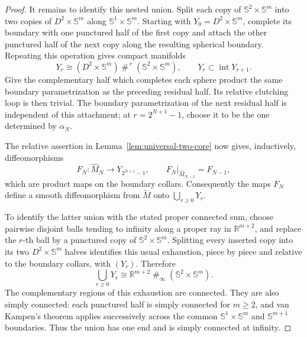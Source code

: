 \documentclass[11pt,reqno]{amsart}
\theoremstyle{definition}
\numberwithin{equation}{section}
\begin{document}
\begin{proof}
It remains to identify this nested union.  Split each copy of
\(\mathbb S^2\times\mathbb S^m\) into two copies of
\(D^2\times\mathbb S^m\) along
\(\mathbb S^1\times\mathbb S^m\).  Starting with
\(Y_0=D^2\times\mathbb S^m\), complete its boundary with one punctured
half of the first copy and attach the other punctured half of the next
copy along the resulting spherical boundary.  Repeating this operation
gives compact manifolds
\[
 Y_r\cong
 (D^2\times\mathbb S^m)
 \mathbin{\#}^{\,r}(\mathbb S^2\times\mathbb S^m),
 \qquad
 Y_r\subset\operatorname{int}Y_{r+1}.
\]
Give the complementary half which completes each sphere product the
same boundary parametrization as the preceding residual half.  Its
relative clutching loop is then trivial.  The boundary parametrization
of the next residual half is independent of this attachment; at
\(r=2^{N+1}-1\), choose it to be the one determined by \(\alpha_N\).

The relative assertion in Lemma~\ref{lem:universal-two-core} now gives,
inductively, diffeomorphisms
\[
 F_N:\widehat M_N\longrightarrow Y_{2^{N+1}-1},
 \qquad
 F_N|_{\widehat M_{N-1}}=F_{N-1},
\]
which are product maps on the boundary collars.  Consequently the maps
\(F_N\) define a smooth diffeomorphism from \(\widetilde M\) onto
\(\bigcup_{r\ge0}Y_r\).

To identify the latter union with the stated proper connected sum,
choose pairwise disjoint balls tending to infinity along a proper ray
in \(\mathbb R^{m+2}\), and replace the \(r\)-th ball by a punctured
copy of \(\mathbb S^2\times\mathbb S^m\).  Splitting every inserted
copy into its two \(D^2\times\mathbb S^m\) halves identifies this
usual exhaustion, piece by piece and relative to the boundary collars,
with \((Y_r)\).  Therefore
\[
 \bigcup_{r\ge0}Y_r
 \cong
 \mathbb R^{m+2}\mathbin{\#}_{\infty}
 (\mathbb S^2\times\mathbb S^m).
\]
The complementary regions of this exhaustion are connected.  They are
also simply connected: each punctured half is simply connected for
\(m\ge2\), and van Kampen's theorem applies successively across the
common \(\mathbb S^1\times\mathbb S^m\) and
\(\mathbb S^{m+1}\) boundaries.  Thus the union has one end and is
simply connected at infinity.
\end{proof}
\end{document}
